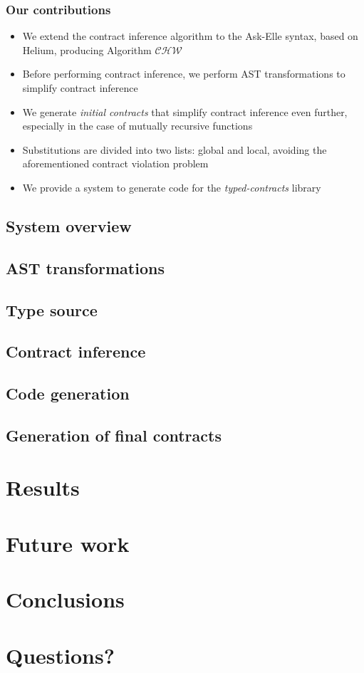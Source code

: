 \documentclass[]{beamer}
\newcommand{\CHW}{$\mathcal{CHW}$}
\begin{document}
\begin{frame}[fragile]
\frametitle{Our contributions}

\begin{itemize}
	\item We extend the contract inference algorithm to the Ask-Elle syntax, based on Helium, producing Algorithm \CHW
	\item Before performing contract inference, we perform AST transformations to simplify contract inference
	\item We generate \textit{initial contracts} that simplify contract inference even further, especially in the case of mutually recursive functions
	\item Substitutions are divided into two lists: global and local, avoiding the aforementioned contract violation problem
	\item We provide a system to generate code for the \textit{typed-contracts} library
\end{itemize}

\end{frame}

\subsection{System overview}

\subsection{AST transformations}

\subsection{Type source}

\subsection{Contract inference}

\subsection{Code generation}

\subsection{Generation of final contracts}

\section{Results}

\section{Future work}

\section{Conclusions}

\section*{Questions?}
\end{document}
